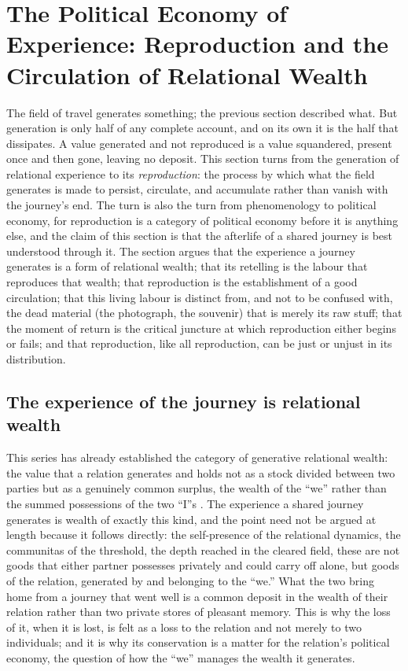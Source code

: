 \section{The Political Economy of Experience: Reproduction and the Circulation of Relational Wealth}
\label{p21:sec:reproduction}

\noindent
The field of travel generates something; the previous section described what. But generation is only half of any complete account, and on its own it is the half that dissipates. A value generated and not reproduced is a value squandered, present once and then gone, leaving no deposit. This section turns from the generation of relational experience to its \emph{reproduction}: the process by which what the field generates is made to persist, circulate, and accumulate rather than vanish with the journey's end. The turn is also the turn from phenomenology to political economy, for reproduction is a category of political economy before it is anything else, and the claim of this section is that the afterlife of a shared journey is best understood through it. The section argues that the experience a journey generates is a form of relational wealth; that its retelling is the labour that reproduces that wealth; that reproduction is the establishment of a good circulation; that this living labour is distinct from, and not to be confused with, the dead material (the photograph, the souvenir) that is merely its raw stuff; that the moment of return is the critical juncture at which reproduction either begins or fails; and that reproduction, like all reproduction, can be just or unjust in its distribution.

\subsection{The experience of the journey is relational wealth}
\label{p21:sub:reproduction-wealth}

This series has already established the category of generative relational wealth: the value that a relation generates and holds not as a stock divided between two parties but as a genuinely common surplus, the wealth of the ``we'' rather than the summed possessions of the two ``I''s \parencite{paperxv}. The experience a shared journey generates is wealth of exactly this kind, and the point need not be argued at length because it follows directly: the self-presence of the relational dynamics, the communitas of the threshold, the depth reached in the cleared field, these are not goods that either partner possesses privately and could carry off alone, but goods of the relation, generated by and belonging to the ``we.'' What the two bring home from a journey that went well is a common deposit in the wealth of their relation rather than two private stores of pleasant memory. This is why the loss of it, when it is lost, is felt as a loss to the relation and not merely to two individuals; and it is why its conservation is a matter for the relation's political economy, the question of how the ``we'' manages the wealth it generates.

